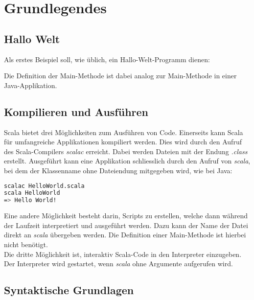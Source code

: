 \chapter{Grundlegendes}

\section{Hallo Welt}
\label{sec:helloWorld}

Als erstes Beispiel soll, wie üblich, ein Hallo-Welt-Programm dienen:



Die Definition der Main-Methode ist dabei analog zur Main-Methode in
einer Java-Applikation.


\section{Kompilieren und Ausführen}

Scala bietet drei Möglichkeiten zum Ausführen von Code. Einerseits kann Scala
für umfangreiche Applikationen kompiliert werden. Dies wird durch den
Aufruf des Scala-Compilers \emph{scalac} erreicht. Dabei werden Dateien
mit der Endung \emph{.class} erstellt. Ausgeführt kann eine Applikation
schliesslich durch den Aufruf von \emph{scala}, bei dem der Klassenname 
ohne Dateiendung mitgegeben wird, wie bei Java:

\begin{lstlisting}[float=ht,language=bash,caption=Kompilieren und ausführen von Scala-Code,label=lst:execute]
scalac HelloWorld.scala
scala HelloWorld
=> Hello World!
\end{lstlisting}

Eine andere Möglichkeit besteht darin, Scripts zu erstellen, welche dann
während der Laufzeit interpretiert und ausgeführt werden. Dazu kann
der Name der Datei direkt an \emph{scala} übergeben werden. Die Definition
einer Main-Methode ist hierbei nicht benötigt.\\

Die dritte Möglichkeit ist, interaktiv Scala-Code in den Interpreter 
einzugeben. Der Interpreter wird gestartet, wenn \emph{scala} ohne
Argumente aufgerufen wird.

\section{Syntaktische Grundlagen}

